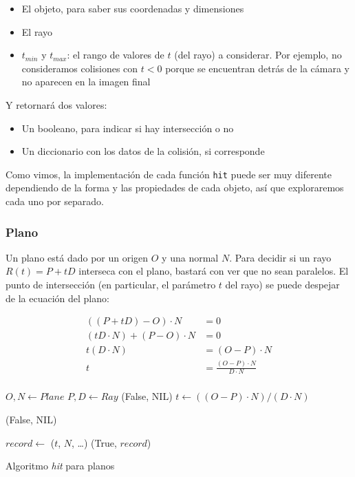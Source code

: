 \begin{itemize}
    \item El objeto, para saber sus coordenadas y dimensiones
    \item El rayo
    \item $t_{min}$ y $t_{max}$: el rango de valores de $t$ (del rayo) a
        considerar. Por ejemplo, no consideramos colisiones con $t < 0$ porque
        se encuentran detrás de la cámara y no aparecen en la imagen final
\end{itemize}

Y retornará dos valores:

\begin{itemize}
    \item Un booleano, para indicar si hay intersección o no
    \item Un diccionario con los datos de la colisión, si corresponde
\end{itemize}

Como vimos, la implementación de cada función \texttt{hit} puede ser muy
diferente dependiendo de la forma y las propiedades de cada objeto, así que
exploraremos cada uno por separado.

\subsubsection{Plano}

Un plano está dado por un origen $O$ y una normal $N$. Para decidir si un rayo
$R(t) = P + tD$ interseca con el plano, bastará con ver que no sean paralelos.
El punto de intersección (en particular, el parámetro $t$ del rayo) se puede
despejar de la ecuación del plano:

\begin{align*}
    ((P + tD) - O) \cdot N &= 0 \\
    (tD \cdot N) + (P - O) \cdot N &= 0 \\
    t(D \cdot N) &= (O - P) \cdot N \\
    t &= \frac{(O - P) \cdot N}{D \cdot N} \\
\end{align*}

\begin{algorithm}[H]
\begin{algorithmic}[1]
    \State $O, N \gets Plane$ 
    \State $P, D \gets Ray$ 
     
        \State \Return (False, NIL)
    \EndIf
    \State $t \gets ((O - P) \cdot N)/(D \cdot N)$

     
        \State \Return (False, NIL)
    \EndIf

    \State $record \gets$ ($t$, $N$, \dots) 
    \State \Return (True, $record$)
\EndFunction
\end{algorithmic}
\caption{Algoritmo \textit{hit} para planos}
\label{alg:plane-hit}
\end{algorithm}

